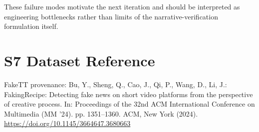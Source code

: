 \documentclass[runningheads]{llncs}
\begin{document}
These failure modes motivate the next iteration and should be interpreted as engineering bottlenecks rather than limits of the narrative-verification formulation itself.

\section*{S7 Dataset Reference}

FakeTT provenance:
Bu, Y., Sheng, Q., Cao, J., Qi, P., Wang, D., Li, J.: FakingRecipe: Detecting fake news on short video platforms from the perspective of creative process. In: Proceedings of the 32nd ACM International Conference on Multimedia (MM '24). pp. 1351--1360. ACM, New York (2024). \url{https://doi.org/10.1145/3664647.3680663}
\end{document}
